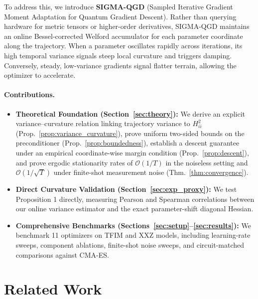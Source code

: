 \documentclass[11pt,a4paper]{article}
\begin{document}
To address this, we introduce \textbf{SIGMA-QGD} (Sampled Iterative Gradient Moment Adaptation for Quantum Gradient Descent). Rather than querying hardware for metric tensors or higher-order derivatives, SIGMA-QGD maintains an online Bessel-corrected Welford accumulator \cite{welford1962note} for each parameter coordinate along the trajectory. When a parameter oscillates rapidly across iterations, its high temporal variance signals steep local curvature and triggers damping. Conversely, steady, low-variance gradients signal flatter terrain, allowing the optimizer to accelerate.

\paragraph{Contributions.}
\begin{itemize}
    \item \textbf{Theoretical Foundation (Section~\ref{sec:theory}):} We derive an explicit variance--curvature relation linking trajectory variance to $H_{ii}^2$ (Prop.~\ref{prop:variance_curvature}), prove uniform two-sided bounds on the preconditioner (Prop.~\ref{prop:boundedness}), establish a descent guarantee under an empirical coordinate-wise margin condition (Prop.~\ref{prop:descent}), and prove ergodic stationarity rates of $\mathcal{O}(1/T)$ in the noiseless setting and $\mathcal{O}(1/\sqrt{T})$ under finite-shot measurement noise (Thm.~\ref{thm:convergence}).
    \item \textbf{Direct Curvature Validation (Section~\ref{sec:exp_proxy}):} We test Proposition 1 directly, measuring Pearson and Spearman correlations between our online variance estimator and the exact parameter-shift diagonal Hessian.
    \item \textbf{Comprehensive Benchmarks (Sections~\ref{sec:setup}--\ref{sec:results}):} We benchmark 11 optimizers on TFIM and XXZ models, including learning-rate sweeps, component ablations, finite-shot noise sweeps, and circuit-matched comparisons against CMA-ES.
\end{itemize}


\section{Related Work}
\label{sec:related}
\end{document}
